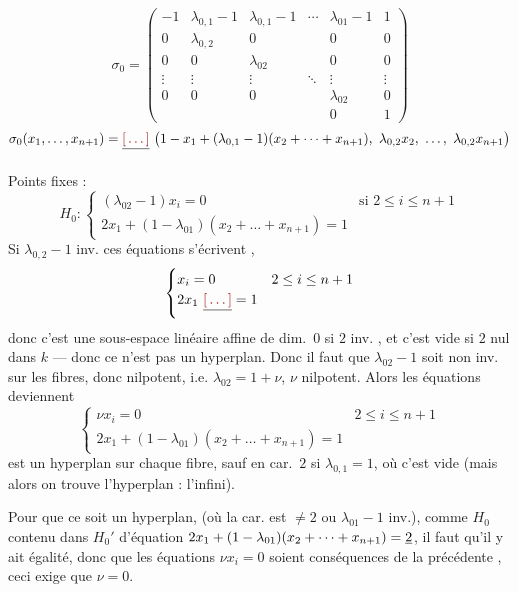\documentclass[11pt,a4paper]{article}
\begin{document}
\[
\sigma_0 =
\begin{pmatrix}
-1 & \lambda_{0,1}-1 & \lambda_{0,1}-1 & \cdots & \lambda_{01}-1 & 1 \\
0 & \lambda_{0,2} & 0 & & 0 & 0 \\
0 & 0 & \lambda_{02} & & 0 & 0 \\
\vdots & \vdots & \vdots & \ddots & \vdots & \vdots \\
0 & 0 & 0 & & \lambda_{02} & 0 \\
 & & & & 0 & 1
\end{pmatrix}
\]
\[
\sigma_0(x_1,\dots,x_{n+1}) = \struck{\ill{}}\ \bigl(1-x_1+(\lambda_{0,1}-1)(x_2+\dots+x_{n+1}),\ \lambda_{0,2}x_2,\ \dots,\ \lambda_{0,2}x_{n+1}\bigr)
\]

Points fixes :
\[
H_0 :
\begin{cases}
(\lambda_{02}-1)x_i = 0 & \text{si } 2\leq i\leq n+1 \\
2x_1+(1-\lambda_{01})(x_2+\dots+x_{n+1}) = 1
\end{cases}
\]
\struck{\ill{}} Si $\lambda_{0,2}-1$ inv. ces équations s'écrivent ,
\[
\begin{cases}
x_i = 0 & 2\leq i\leq n+1 \\
2x_1\ \struck{\ill{}} = 1
\end{cases}
\]
donc c'est une sous-espace linéaire affine de dim.~$0$ \struck{\ill{}}  \struck{\ill{}} si $2$ inv. \struck{\ill{}}, et c'est vide si $2$ nul dans $k$  --- donc ce n'est pas un hyperplan. Donc il faut que $\lambda_{02}-1$ soit non inv.  sur les fibres, donc nilpotent, i.e. $\lambda_{02}=1+\nu$, $\nu$ nilpotent. Alors les équations deviennent
\[
\begin{cases}
\nu x_i = 0 & 2\leq i\leq n+1 \\
2x_1+(1-\lambda_{01})(x_2+\dots+x_{n+1}) = 1
\end{cases}
\]
est un hyperplan sur chaque fibre, sauf  en car.~$2$ si $\lambda_{0,1}=1$, où c'est vide (mais alors on trouve l'hyperplan : l'infini).

Pour que ce soit un hyperplan,  \struck{\ill{}} \add{\ill{}} (où la car. est $\neq 2$ \struck{\ill{}} ou $\lambda_{01}-1$ inv.), comme  $H_0$ contenu dans $H_0'$ d'équation $2x_1+(1-\lambda_{01})(x_2+\dots+x_{n+1})=\uncertain{2}$, il faut qu'il y ait égalité, donc que les équations $\nu x_i=0$  soient conséquences de la précédente ,  ceci exige que $\nu=0$. 
\end{document}
